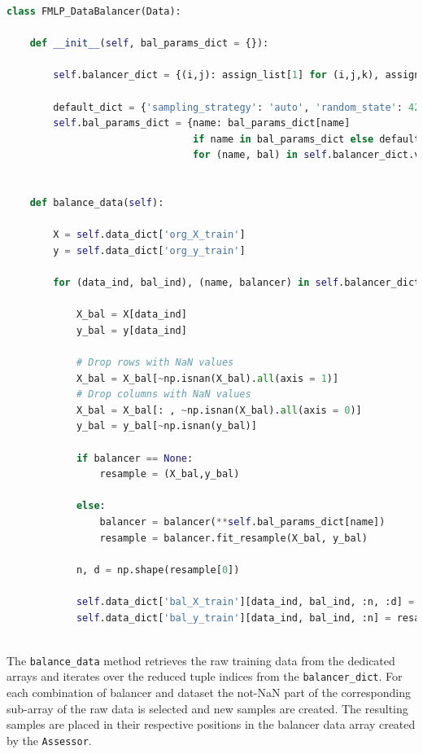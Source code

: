 \begin{lstlisting}[language=Python, numbers=none]
class FMLP_DataBalancer(Data):

    def __init__(self, bal_params_dict = {}):

        self.balancer_dict = {(i,j): assign_list[1] for (i,j,k), assign_list in self.data_dict['assignment_dict'].items()}
        
        default_dict = {'sampling_strategy': 'auto', 'random_state': 42}
        self.bal_params_dict = {name: bal_params_dict[name]
                                if name in bal_params_dict else default_dict
                                for (name, bal) in self.balancer_dict.values()}
        
     
    def balance_data(self):

        X = self.data_dict['org_X_train']
        y = self.data_dict['org_y_train']

        for (data_ind, bal_ind), (name, balancer) in self.balancer_dict.items():

            X_bal = X[data_ind]
            y_bal = y[data_ind]
            
            # Drop rows with NaN values
            X_bal = X_bal[~np.isnan(X_bal).all(axis = 1)]
            # Drop columns with NaN values
            X_bal = X_bal[: , ~np.isnan(X_bal).all(axis = 0)]
            y_bal = y_bal[~np.isnan(y_bal)]
            
            if balancer == None:
                resample = (X_bal,y_bal)

            else:
                balancer = balancer(**self.bal_params_dict[name])
                resample = balancer.fit_resample(X_bal, y_bal)

            n, d = np.shape(resample[0])
                        
            self.data_dict['bal_X_train'][data_ind, bal_ind, :n, :d] = resample[0]
            self.data_dict['bal_y_train'][data_ind, bal_ind, :n] = resample[1]
            
\end{lstlisting}

The \texttt{balance\_data} method retrieves the raw training data from the dedicated arrays and iterates over the reduced tuple indices from the \texttt{balancer\_dict}.
For each combination of balancer and dataset the not-NaN part of the corresponding sub-array of the raw data is selected and new samples are created. 
The resulting samples are placed in their respective positions in the balancer data array created by the \texttt{Assessor}.

